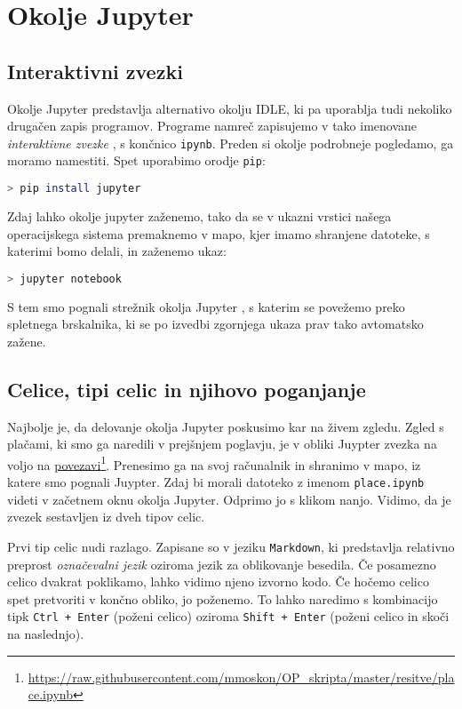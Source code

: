 \chapter{Okolje Jupyter}

\section{Interaktivni zvezki}
Okolje Jupyter predstavlja alternativo okolju IDLE, ki pa uporablja tudi nekoliko drugačen zapis programov. Programe namreč zapisujemo v tako imenovane \emph{interaktivne zvezke} , s končnico \texttt{ipynb}. Preden si okolje podrobneje pogledamo, ga moramo namestiti. Spet uporabimo orodje \texttt{pip}:
\begin{lstlisting}[language=bash]
> pip install jupyter
\end{lstlisting}
Zdaj lahko okolje jupyter zaženemo, tako da se v ukazni vrstici našega operacijskega sistema premaknemo v mapo, kjer imamo shranjene datoteke, s katerimi bomo delali, in zaženemo ukaz:
\begin{lstlisting}[language=bash]
> jupyter notebook
\end{lstlisting}
S tem smo pognali strežnik okolja Jupyter , s katerim se povežemo preko spletnega brskalnika, ki se po izvedbi zgornjega ukaza prav tako avtomatsko zažene. 

\section{Celice, tipi celic in njihovo poganjanje}
Najbolje je, da delovanje okolja Jupyter poskusimo kar na živem zgledu. Zgled s plačami, ki smo ga naredili v prejšnjem poglavju, je v obliki Juypter zvezka na voljo na \href{https://raw.githubusercontent.com/mmoskon/OP_skripta/master/resitve/place.ipynb}{povezavi}\footnote{\url{https://raw.githubusercontent.com/mmoskon/OP_skripta/master/resitve/place.ipynb}}. Prenesimo ga na svoj računalnik in shranimo v mapo, iz katere smo pognali Juypter. Zdaj bi morali datoteko z imenom \texttt{place.ipynb} videti v začetnem oknu okolja Jupyter. Odprimo jo s klikom nanjo. Vidimo, da je zvezek sestavljen iz dveh tipov celic. 

Prvi tip celic nudi razlago. Zapisane so v jeziku \texttt{Markdown}, ki predstavlja relativno preprost \emph{označevalni jezik} oziroma jezik za oblikovanje besedila. Če posamezno celico dvakrat poklikamo, lahko vidimo njeno izvorno kodo. Če hočemo celico spet pretvoriti v končno obliko, jo poženemo. To lahko naredimo s kombinacijo tipk \texttt{Ctrl + Enter} (poženi celico) oziroma \texttt{Shift + Enter} (poženi celico in skoči na naslednjo).

